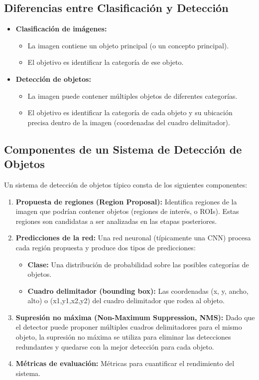 \documentclass{article}
\begin{document}
\subsection{Diferencias entre Clasificación y Detección}

\begin{itemize}
    \item \textbf{Clasificación de imágenes:}
        \begin{itemize}
            \item La imagen contiene un objeto principal (o un concepto principal).
            \item El objetivo es identificar la categoría de ese objeto.
        \end{itemize}
    \item \textbf{Detección de objetos:}
        \begin{itemize}
            \item La imagen puede contener múltiples objetos de diferentes categorías.
            \item El objetivo es identificar la categoría de cada objeto y su ubicación precisa dentro de la imagen (coordenadas del cuadro delimitador).
        \end{itemize}
\end{itemize}

\subsection{Componentes de un Sistema de Detección de Objetos}

Un sistema de detección de objetos típico consta de los siguientes componentes:

\begin{enumerate}
    \item \textbf{Propuesta de regiones (Region Proposal):}  Identifica regiones de la imagen que podrían contener objetos (regiones de interés, o ROIs).  Estas regiones son candidatas a ser analizadas en las etapas posteriores.
    \item \textbf{Predicciones de la red:}  Una red neuronal (típicamente una CNN) procesa cada región propuesta y produce dos tipos de predicciones:
        \begin{itemize}
            \item \textbf{Clase:}  Una distribución de probabilidad sobre las posibles categorías de objetos.
            \item \textbf{Cuadro delimitador (bounding box):}  Las coordenadas (x, y, ancho, alto) o (x1,y1,x2,y2) del cuadro delimitador que rodea al objeto.
        \end{itemize}
    \item \textbf{Supresión no máxima (Non-Maximum Suppression, NMS):}  Dado que el detector puede proponer múltiples cuadros delimitadores para el mismo objeto, la supresión no máxima se utiliza para eliminar las detecciones redundantes y quedarse con la mejor detección para cada objeto.
    \item \textbf{Métricas de evaluación:} Métricas para cuantificar el rendimiento del sistema.
\end{enumerate}
\end{document}
